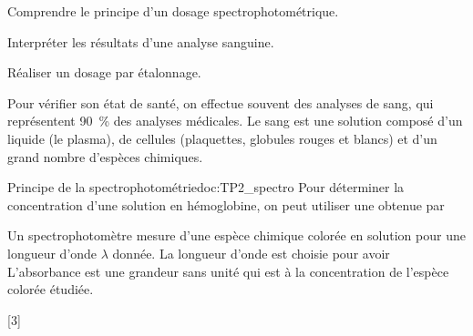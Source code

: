 \teteTermStssDosa

\vspace*{-30pt}

\begin{objectifs}
  \item Comprendre le principe d'un dosage spectrophotométrique.
  \item Interpréter les résultats d'une analyse sanguine.
  \item Réaliser un dosage par étalonnage.
\end{objectifs}

\begin{contexte}
  Pour vérifier son état de santé, on effectue souvent des analyses de sang, qui représentent \qty{90}{\percent} des analyses médicales.  
  Le sang est une solution composé d'un liquide (le plasma), de cellules (plaquettes, globules rouges et blancs) et d'un grand nombre d'espèces chimiques.
  
\end{contexte}


\begin{doc}{Principe de la spectrophotométrie}{doc:TP2_spectro}
  Pour déterminer la concentration d'une solution en hémoglobine, on peut utiliser une  obtenue par 

  Un spectrophotomètre mesure  d'une espèce chimique colorée en solution pour une longueur d'onde $\lambda$ donnée.
  La longueur d'onde est choisie pour avoir 
  L'absorbance est une grandeur sans unité qui est  à la concentration de l'espèce colorée étudiée.
\end{doc}

[3]



